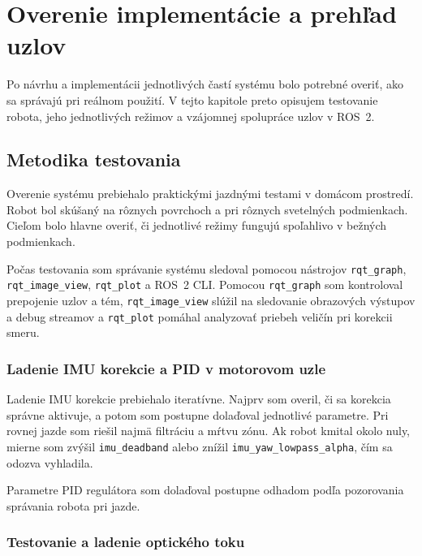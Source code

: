         \section{Overenie implementácie a prehľad uzlov}
        \label{sec:navrh-uzlov}
      
        Po návrhu a implementácii jednotlivých častí systému bolo potrebné overiť, ako sa správajú pri reálnom použití. V tejto kapitole preto opisujem testovanie robota, jeho jednotlivých režimov a vzájomnej spolupráce uzlov v ROS~2.
      
        \subsection*{Metodika testovania}
      
        Overenie systému prebiehalo praktickými jazdnými testami v domácom prostredí. Robot bol skúšaný na rôznych povrchoch a pri rôznych svetelných podmienkach. Cieľom bolo hlavne overiť, či jednotlivé režimy fungujú spoľahlivo v bežných podmienkach.
      
        Počas testovania som správanie systému sledoval pomocou nástrojov \texttt{rqt\_graph}, \texttt{rqt\_image\_view}, \texttt{rqt\_plot} a ROS~2 CLI. Pomocou \texttt{rqt\_graph} som kontroloval prepojenie uzlov a tém, \texttt{rqt\_image\_view} slúžil na sledovanie obrazových výstupov a debug streamov a \texttt{rqt\_plot} pomáhal analyzovať priebeh veličín pri korekcii smeru.
      
        \subsubsection{Ladenie IMU korekcie a PID v motorovom uzle}
      
        Ladenie IMU korekcie prebiehalo iteratívne. Najprv som overil, či sa korekcia správne aktivuje, a potom som postupne dolaďoval jednotlivé parametre. Pri rovnej jazde som riešil najmä filtráciu a mŕtvu zónu. Ak robot kmital okolo nuly, mierne som zvýšil \texttt{imu\_deadband} alebo znížil \texttt{imu\_yaw\_lowpass\_alpha}, čím sa odozva vyhladila.
      
        Parametre PID regulátora som dolaďoval postupne odhadom podľa pozorovania správania robota pri jazde.
      
        \subsubsection{Testovanie a ladenie optického toku}
      
